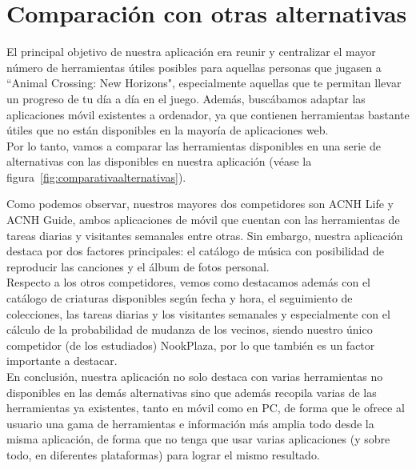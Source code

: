 \chapter{Comparación con otras alternativas}\label{alternativas}

El principal objetivo de nuestra aplicación era reunir y centralizar el mayor número de herramientas útiles posibles para aquellas personas que jugasen a ``Animal Crossing: New Horizons", especialmente aquellas que te permitan llevar un progreso de tu día a día en el juego. Además, buscábamos adaptar las aplicaciones móvil existentes a ordenador, ya que contienen herramientas bastante útiles que no están disponibles en la mayoría de aplicaciones web.\\

Por lo tanto, vamos a comparar las herramientas disponibles en una serie de alternativas con las disponibles en nuestra aplicación {(v\'ease la figura~\ref{fig:comparativaalternativas})}.\\


\clearpage

Como podemos observar, nuestros mayores dos competidores son ACNH Life y ACNH Guide, ambos aplicaciones de móvil que cuentan con las herramientas de tareas diarias y visitantes semanales entre otras. Sin embargo, nuestra aplicación destaca por dos factores principales: el catálogo de música con posibilidad de reproducir las canciones y el álbum de fotos personal.\\

Respecto a los otros competidores, vemos como destacamos además con el catálogo de criaturas disponibles según fecha y hora, el seguimiento de colecciones, las tareas diarias y los visitantes semanales y especialmente con el cálculo de la probabilidad de mudanza de los vecinos, siendo nuestro único competidor (de los estudiados) NookPlaza, por lo que también es un factor importante a destacar.\\

En conclusión, nuestra aplicación no solo destaca con varias herramientas no disponibles en las demás alternativas sino que además recopila varias de las herramientas ya existentes, tanto en móvil como en PC, de forma que le ofrece al usuario una gama de herramientas e información más amplia todo desde la misma aplicación, de forma que no tenga que usar varias aplicaciones (y sobre todo, en diferentes plataformas) para lograr el mismo resultado.













	








	
	 




